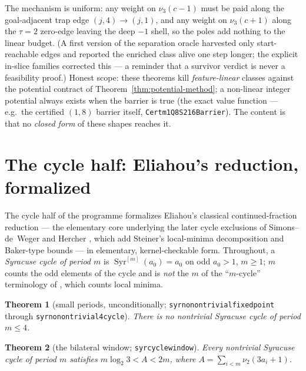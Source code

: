 \documentclass[11pt]{amsart}
\newtheorem{theorem}{Theorem}[section]
\theoremstyle{definition}
\theoremstyle{remark}
\newcommand{\Syr}{\operatorname{Syr}}
\newcommand{\lean}[1]{{\def\_{\textunderscore\allowbreak}\texttt{#1}}}
\newcommand{\nuthree}{\nu_3}
\newcommand{\nutwo}{\nu_2}
\begin{document}
\noindent
The mechanism is uniform: any weight on $\nuthree(c-1)$ must be paid along
the goal-adjacent trap edge $(j,4) \to (j,1)$, and any weight on
$\nuthree(c+1)$ along the $\tau{=}2$ zero-edge leaving the deep $-1$ shell,
so the poles add nothing to the linear budget.  (A first version of the
separation oracle harvested only start-reachable edges and reported the
enriched class alive one step longer; the explicit in-slice families
corrected this --- a reminder that a survivor verdict is never a
feasibility proof.)
Honest scope: these theorems kill \emph{feature-linear} classes against the
potential contract of Theorem~\ref{thm:potential-method}; a non-linear
integer potential always exists when the barrier is true (the exact value
function --- e.g.\ the certified $(1,8)$ barrier itself,
\lean{Cert\_m1\_Q8\_S216\_Barrier}).  The content is that no \emph{closed
form} of these shapes reaches it.

\section{The cycle half: Eliahou's reduction, formalized}
\label{sec:cycles}

The cycle half of the programme formalizes Eliahou's classical
continued-fraction reduction \cite{Eliahou1993} --- the elementary core
underlying the later cycle exclusions of Simons--de~Weger
\cite{SimonsDeWeger2005} and Hercher \cite{Hercher2023}, which add Steiner's
local-minima decomposition and Baker-type bounds --- in elementary,
kernel-checkable form.  Throughout, a \emph{Syracuse cycle of period $m$} is
$\Syr^{[m]}(a_0) = a_0$ on odd $a_0 > 1$, $m \ge 1$; $m$ counts the odd
elements of the cycle and is \emph{not} the $m$ of the ``$m$-cycle''
terminology of \cite{SimonsDeWeger2005,Hercher2023}, which counts local
minima.

\begin{theorem}[small periods, unconditionally;
\lean{syr\_no\_nontrivial\_fixedpoint} through \lean{syr\_no\_nontrivial\_4cycle}]
There is no nontrivial Syracuse cycle of period $m \le 4$.
\end{theorem}

\begin{theorem}[the bilateral window; \lean{syr\_cycle\_window}]
\label{thm:window}
Every nontrivial Syracuse cycle of period $m$ satisfies $m\log_2 3 < A < 2m$, where
$A = \sum_{i<m} \nutwo(3a_i + 1)$.
\end{theorem}
\end{document}
